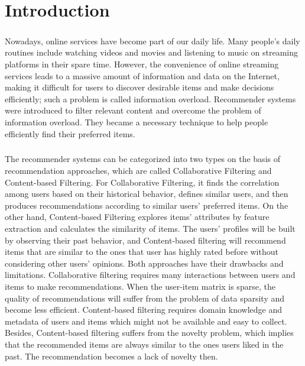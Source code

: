 \documentclass[a4paper,12pt]{report}
\begin{document}
\setcounter{page}{4}
\tableofcontents \newpage
{}
\listoffigures \newpage
{}
\listoftables \newpage
{}

\setcounter{page}{1}

\chapter{Introduction}

\paragraph{}
Nowadays, online services have become part of our daily life. Many people's daily routines include watching videos and movies and listening to music on streaming platforms in their spare time. However, the convenience of online streaming services leads to a massive amount of information and data on the Internet, making it difficult for users to discover desirable items and make decisions efficiently; such a problem is called information overload. Recommender systems were introduced to filter relevant content and overcome the problem of information overload. They became a necessary technique to help people efficiently find their preferred items.
\paragraph{}
The recommender systems can be categorized into two types on the basis of recommendation approaches, which are called Collaborative Filtering\cite{sarwar2001item,linden2003amazon,bennett2007netflix,breese2013empirical,Reddy2014music,Barathy2020Matrix} and Content-based Filtering\cite{basu1998recommendation,van2000using,pazzani2007content,cantador2010content,Singla2020flex}. For Collaborative Filtering, it finds the correlation among users based on their historical behavior, defines similar users, and then produces recommendations according to similar users' preferred items. On the other hand, Content-based Filtering explores items' attributes by feature extraction and calculates the similarity of items. The users' profiles will be built by observing their past behavior, and Content-based filtering will recommend items that are similar to the ones that user has highly rated before without considering other users' opinions. Both approaches have their drawbacks and limitations. Collaborative filtering requires many interactions between users and items to make recommendations. When the user-item matrix is sparse,  the quality of recommendations will suffer from the problem of data sparsity and become less efficient. Content-based filtering requires domain knowledge and metadata of users and items which might not be available and easy to collect. Besides, Content-based filtering suffers from the novelty problem, which implies that the recommended items are always similar to the ones users liked in the past. The recommendation becomes a lack of novelty then.
\end{document}
